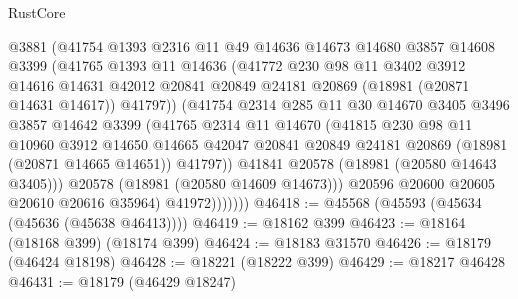 \begin{lexlean}{RustCore}
\begin{coremodule}
                    @3881
                    (@41754
                      @1393
                      @2316
                      @11
                      @49
                      @14636
                      @14673
                      @14680
                      @3857
                      @14608
                      @3399
                      (@41765
                        @1393
                        @11
                        @14636
                        (@41772
                          @230
                          @98
                          @11
                          @3402
                          @3912
                          @14616
                          @14631
                          @42012
                          @20841
                          @20849
                          @24181
                          @20869
                          (@18981 (@20871 @14631 @14617))
                          @41797))
                      (@41754
                        @2314
                        @285
                        @11
                        @30
                        @14670
                        @3405
                        @3496
                        @3857
                        @14642
                        @3399
                        (@41765
                          @2314
                          @11
                          @14670
                          (@41815
                            @230
                            @98
                            @11
                            @10960
                            @3912
                            @14650
                            @14665
                            @42047
                            @20841
                            @20849
                            @24181
                            @20869
                            (@18981 (@20871 @14665 @14651))
                            @41797))
                        @41841
                        @20578
                        (@18981 (@20580 @14643 @3405)))
                      @20578
                      (@18981 (@20580 @14609 @14673)))
                    @20596
                    @20600
                    @20605
                    @20610
                    @20616
                    @35964)
                  @41972)))))))
@46418 := @45568 (@45593 (@45634 (@45636 (@45638 @46413))))
@46419 := @18162 @399
@46423 := @18164 (@18168 @399) (@18174 @399)
@46424 := @18183 @31570
@46426 := @18179 (@46424 @18198)
@46428 := @18221 (@18222 @399)
@46429 := @18217 @46428
@46431 := @18179 (@46429 @18247)

\end{coremodule}
\end{lexlean}
